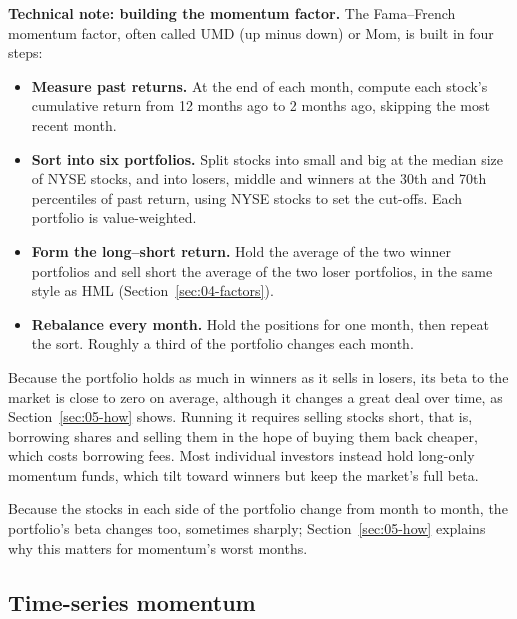 \begin{technote}
\textbf{Technical note: building the momentum factor.} The Fama--French momentum factor, often called UMD (up minus down) or Mom, is built in four steps:

\begin{itemize}
  \item \textbf{Measure past returns.} At the end of each month, compute each stock's cumulative return from 12 months ago to 2 months ago, skipping the most recent month.
  \item \textbf{Sort into six portfolios.} Split stocks into small and big at the median size of NYSE stocks, and into losers, middle and winners at the 30th and 70th percentiles of past return, using NYSE stocks to set the cut-offs. Each portfolio is value-weighted.
  \item \textbf{Form the long--short return.} Hold the average of the two winner portfolios and sell short the average of the two loser portfolios, in the same style as HML (Section~\ref{sec:04-factors}).
  \item \textbf{Rebalance every month.} Hold the positions for one month, then repeat the sort. Roughly a third of the portfolio changes each month.
\end{itemize}
\end{technote}

Because the portfolio holds as much in winners as it sells in losers, its beta to the market is close to zero on average, although it changes a great deal over time, as Section~\ref{sec:05-how} shows. Running it requires selling stocks short, that is, borrowing shares and selling them in the hope of buying them back cheaper, which costs borrowing fees. Most individual investors instead hold long-only momentum funds, which tilt toward winners but keep the market's full beta.

Because the stocks in each side of the portfolio change from month to month, the portfolio's beta changes too, sometimes sharply; Section~\ref{sec:05-how} explains why this matters for momentum's worst months.

\subsection{Time-series momentum}

